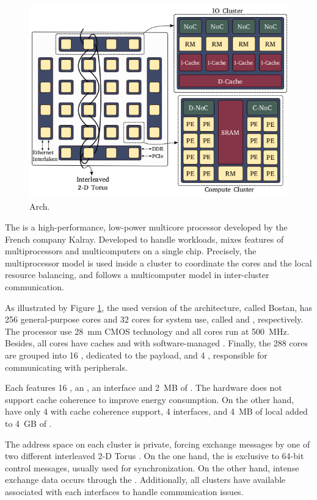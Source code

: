 		\begin{figure}[h]
			\centering
			\includegraphics[width=.7\textwidth]{images/arch-mppa.png}

			\caption{
				\mppa Arch.
			}\par
			\label{fig.mppa-arch}
		\end{figure}

		The \mppa is a high-performance, low-power multicore processor
		developed by the French company Kalray.
		Developed to handle \mimd workloads, \mppa mixes features of
		multiprocessors and multicomputers on a single chip.
		Precisely, the multiprocessor model is used inside a cluster
		to coordinate the cores and the local resource balancing, and
		follows a multicomputer model in inter-cluster communication.

		As illustrated by Figure \ref{fig.mppa-arch}, the used version of
		the architecture, called Bostan, has 256 general-purpose cores and
		32 cores for system use, called \pes and \rmans, respectively.
		The processor use 28~mm CMOS technology and all cores run at 500~MHz.
		Besides, all cores have caches and \mmus with software-managed \tlbs.
		Finally, the 288 cores are grouped into 16 \cclusters, dedicated to
		the payload, and 4 \ioclusters, responsible for communicating with peripherals.

		Each \ccluster features 16 \pes, an \rman, an \noc interface and 2~MB of \sram.
		The hardware does not support cache coherence to improve energy consumption.
		On the other hand, \ioclusters have only 4 \rmans with cache coherence support,
		4 \noc interfaces, and 4~MB of local \sram added to 4~GB of \dram.

		The address space on each cluster is private, forcing exchange messages
		by one of two different interleaved 2-D Torus \nocs.
		On the one hand, the \cnoc is exclusive to 64-bit control messages,
		usually used for synchronization.
		On the other hand, intense exchange data occurs through the \dnoc.
		Additionally, all clusters have available \dmas associated with each
		\noc interfaces to handle communication issues.

